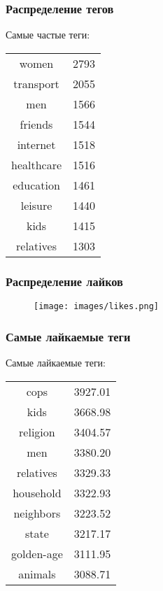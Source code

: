 \documentclass[14pt]{beamer}
\begin{document}
\begin{frame}[fragile]
	
	\frametitle{Распределение тегов}
	
	\begin{center}
		Самые частые теги:
		
		\begin{tabular}{c|c}
			women & 2793 \\
			transport & 2055 \\
			\colorbox{blue!30}{men} & 1566 \\
			friends & 1544 \\
			internet & 1518 \\
			healthcare & 1516 \\
			education & 1461 \\
			leisure & 1440 \\
			\colorbox{blue!30}{kids} & 1415 \\
			\colorbox{blue!30}{relatives} & 1303 \\
		\end{tabular}
	\end{center}
	
\end{frame}

\begin{frame}[fragile]
	
	\frametitle{Распределение лайков}
	
	\begin{figure}
		\texttt{[image: images/likes.png]}
	\end{figure}
	
\end{frame}


\begin{frame}[fragile]
	
	\frametitle{Самые лайкаемые теги}
	
	\begin{center}
		Самые лайкаемые теги:
		
		\begin{tabular}{c|c}
			cops & 3927.01 \\
			\colorbox{blue!30}{kids} & 3668.98 \\
			religion & 3404.57 \\
			\colorbox{blue!30}{men} & 3380.20 \\
			\colorbox{blue!30}{relatives} & 3329.33 \\
			household & 3322.93 \\
			neighbors & 3223.52 \\
			state & 3217.17 \\
			golden-age & 3111.95 \\
			animals & 3088.71 \\
		\end{tabular}
	\end{center}
	
\end{frame}
\end{document}
